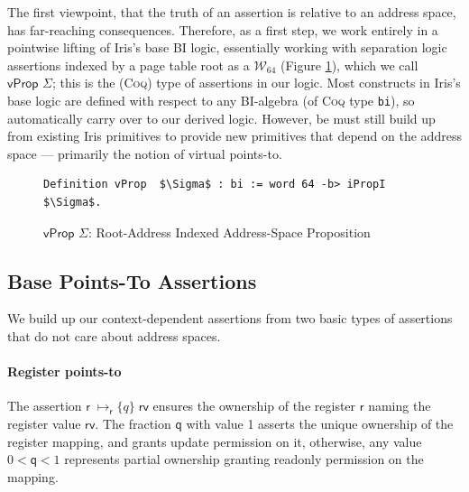 \documentclass[acmsmall,screen,nonacm]{acmart}
\newcommand{\qfrac}{\kw{q}}
\newcommand{\kw}[1]{\mathsf{#1}}
\newcommand{\rv}{\kw{rv}}
\newcommand{\rg}{\kw{r}}
\begin{document}
The first viewpoint, that the truth of an assertion is relative to an address space, has far-reaching consequences.
Therefore, as a first step, we work entirely in a pointwise lifting of Iris's base BI logic,
essentially working with separation logic assertions indexed by a page table root as a $\mathcal{W}_{64}$
(Figure \ref{fig:vprop}), which we call $\textsf{vProp }\Sigma$; this is the (\textsc{Coq}) type of assertions in our logic.
Most constructs in Iris's base logic are defined with respect to any BI-algebra (of \textsc{Coq} type \lstinline|bi|), so automatically
carry over to our derived logic.
However, be must still build up from existing Iris primitives to provide new primitives that depend on the address space --- primarily the notion
of virtual points-to.

\begin{figure}[t]
\begin{lstlisting}[language=Coq]
  Definition vProp  $\Sigma$ : bi := word 64 -b> iPropI  $\Sigma$.
  \end{lstlisting}
\caption{$\textsf{vProp }\Sigma$: Root-Address Indexed Address-Space Proposition}
  \label{fig:vprop}
\end{figure}

\subsection{Base Points-To Assertions}
\label{sec:pointsto}
We build up our context-dependent assertions from two basic types of assertions that do not care about address spaces.

\paragraph{Register points-to} 
The assertion $\textsf{r}\;\mapsto_{\textsf{r}}\{q\}\;\textsf{rv}$ ensures the ownership of the register $\rg$ naming the register value $\rv$. 
The fraction $\qfrac$ with value 1 asserts the unique ownership of the register mapping, and grants update permission on it, 
otherwise, any value $0 < \qfrac <1$ represents partial ownership granting readonly permission on the mapping.
\end{document}
